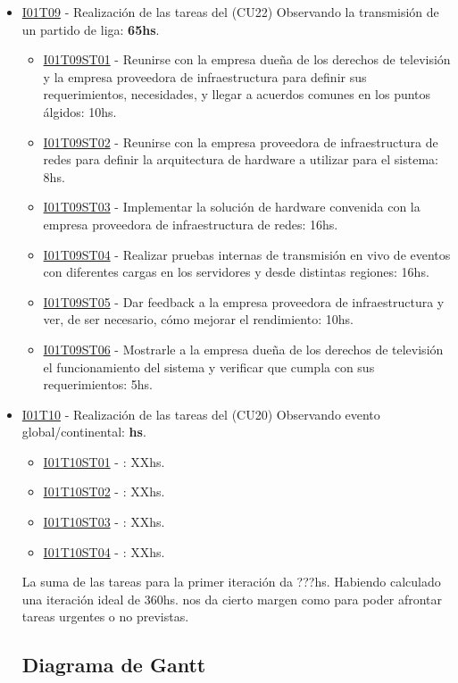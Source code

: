 \begin{itemize}
\item \underline{I01T09} - Realización de las tareas del (CU22) Observando la transmisión de un partido de liga: \textbf{65hs}.
  \begin{itemize}
    \item \underline{I01T09ST01} - Reunirse con la empresa dueña de los derechos de televisión y la empresa proveedora de infraestructura para definir sus requerimientos, necesidades, y llegar a acuerdos comunes en los puntos álgidos: 10hs.
    \item \underline{I01T09ST02} - Reunirse con la empresa proveedora de infraestructura de redes para definir la arquitectura de hardware a utilizar para el sistema: 8hs.
    \item \underline{I01T09ST03} - Implementar la solución de hardware convenida con la empresa proveedora de infraestructura de redes: 16hs.
    \item \underline{I01T09ST04} - Realizar pruebas internas de transmisión en vivo de eventos con diferentes cargas en los servidores y desde distintas regiones: 16hs.
    \item \underline{I01T09ST05} - Dar feedback a la empresa proveedora de infraestructura y ver, de ser necesario, cómo mejorar el rendimiento: 10hs.
    \item \underline{I01T09ST06} - Mostrarle a la empresa dueña de los derechos de televisión el funcionamiento del sistema y verificar que cumpla con sus requerimientos: 5hs.
  \end{itemize}
\hfill

\item \underline{I01T10} - Realización de las tareas del (CU20) Observando evento global/continental: \textbf{hs}.
  \begin{itemize}
    \item \underline{I01T10ST01} - : XXhs.
    \item \underline{I01T10ST02} - : XXhs.
    \item \underline{I01T10ST03} - : XXhs.
    \item \underline{I01T10ST04} - : XXhs.
  \end{itemize}
\hfill

La suma de las tareas para la primer iteración da ???hs. Habiendo calculado una iteración ideal de 360hs. nos da cierto margen como para poder afrontar tareas urgentes o no previstas.

\subsection{Diagrama de Gantt}
  
\end{itemize}
